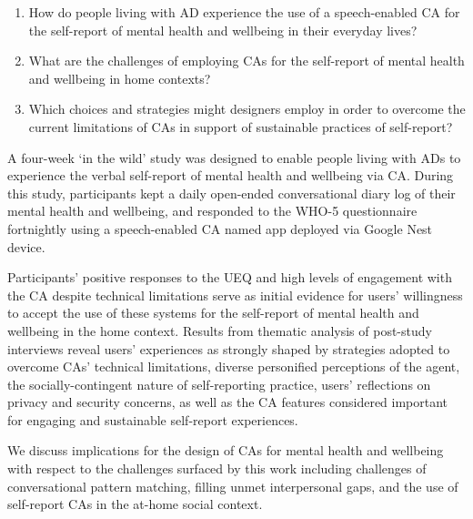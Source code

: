     \begin{enumerate}[label=RQ\arabic*:]

        \item\label{rq:1} How do people living with \ac{AD} experience the use of a speech-enabled \ac{CA} for the self-report of mental health and wellbeing in their everyday lives?
        
        \item\label{rq:2} What are the challenges of employing \ac{CA}s for the self-report of mental health and wellbeing in home contexts?

        \item\label{rq:3} Which choices and strategies might designers employ in order to overcome the current limitations of \ac{CA}s in support of sustainable practices of self-report?
        
    \end{enumerate}    

    A four-week `in the wild' study was designed to enable people living with \ac{AD}s to experience the verbal self-report of mental health and wellbeing via \ac{CA}. During this study, participants kept a daily open-ended conversational diary log of their mental health and wellbeing, and responded to the \ac{WHO-5} questionnaire fortnightly using a speech-enabled \ac{CA} named \acl{app} deployed via Google Nest device. 

    Participants' positive responses to the \ac{UEQ} and high levels of engagement with the \ac{CA} despite technical limitations serve as initial evidence for users' willingness to accept the use of these systems for the self-report of mental health and wellbeing in the home context. Results from thematic analysis of post-study interviews reveal users' experiences as strongly shaped by strategies adopted to overcome \ac{CA}s' technical limitations, diverse personified perceptions of the agent, the socially-contingent nature of self-reporting practice, users' reflections on privacy and security concerns, as well as the \ac{CA} features considered important for engaging and sustainable self-report experiences.

    We discuss implications for the design of \ac{CA}s for mental health and wellbeing with respect to the challenges surfaced by this work including challenges of conversational pattern matching, filling unmet interpersonal gaps, and the use of self-report \ac{CA}s in the at-home social context.
     

